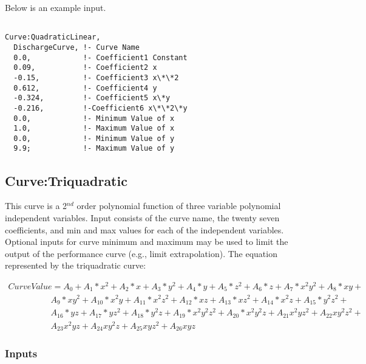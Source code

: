 Below is an example input.

\begin{lstlisting}

Curve:QuadraticLinear,
  DischargeCurve, !- Curve Name
  0.0,            !- Coefficient1 Constant
  0.09,           !- Coefficient2 x
  -0.15,          !- Coefficient3 x\*\*2
  0.612,          !- Coefficient4 y
  -0.324,         !- Coefficient5 x\*y
  -0.216,         !-Coefficient6 x\*\*2\*y
  0.0,            !- Minimum Value of x
  1.0,            !- Maximum Value of x
  0.0,            !- Minimum Value of y
  9.9;            !- Maximum Value of y
\end{lstlisting}

\subsection{Curve:Triquadratic}\label{curvetriquadratic}

This curve is a 2\(^{nd}\) order polynomial function of three variable polynomial independent variables. Input consists of the curve name, the twenty seven coefficients, and min and max values for each of the independent variables. Optional inputs for curve minimum and maximum may be used to limit the output of the performance curve (e.g., limit extrapolation). The equation represented by the triquadratic curve:

\begin{equation}
  \begin{array}{l}
    CurveValue = {A_0} + {A_1}*{x^2} + {A_2}*x + {A_3}*{y^2} + {A_4}*y + {A_5}*{z^2} + {A_6}*z + {A_7}*{x^2}{y^2} + {A_8}*xy + \\
    \quad \quad \quad \quad \quad {A_9}*x{y^2} + {A_{10}}*{x^2}y + {A_{11}}*{x^2}{z^2} + {A_{12}}*xz + {A_{13}}*x{z^2} + {A_{14}}*{x^2}z + {A_{15}}*{y^2}{z^2} + \\
    \quad \quad \quad \quad \quad {A_{16}}*yz + {A_{17}}*y{z^2} + {A_{18}}*{y^2}z + {A_{19}}*{x^2}{y^2}{z^2} + {A_{20}}*{x^2}{y^2}z + {A_{21}}{x^2}y{z^2} + {A_{22}}x{y^2}{z^2} + \\
    \quad \quad \quad \quad \quad {A_{23}}{x^2}yz + {A_{24}}x{y^2}z + {A_{25}}xy{z^2} + {A_{26}}xyz
  \end{array}
\end{equation}

\subsubsection{Inputs}\label{inputs-10-011}

